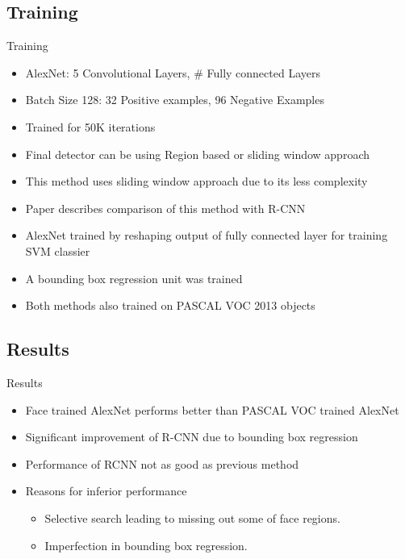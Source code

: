 \documentclass{beamer}
\begin{document}
\subsection{Training}
\begin{frame}{Training}
  \begin{itemize}
      \item AlexNet: 5 Convolutional Layers, # Fully connected Layers
      \item Batch Size 128: 32 Positive examples, 96 Negative Examples
      \item Trained for 50K iterations
      \item Final detector can be using Region based or sliding window approach
      \item This method uses sliding window approach due to its less complexity
      \item Paper describes comparison of this method with R-CNN
      \item AlexNet trained by reshaping output of fully connected layer for training SVM classier
      \item A bounding box regression unit was trained
      \item Both methods also trained on PASCAL VOC 2013 objects
  \end{itemize}
\end{frame}
\subsection{Results}
\begin{frame}{Results}
  \begin{itemize}
      \item Face trained AlexNet performs better than PASCAL VOC trained AlexNet
      \item Significant improvement of R-CNN due to bounding box regression
      \item Performance of RCNN not as good as previous method
      \item Reasons for inferior performance
      \begin{itemize}
        \item Selective search leading to missing out some of face regions.
        \item Imperfection in bounding box regression.
      \end{itemize}
  \end{itemize}
\end{frame}
\end{document}
